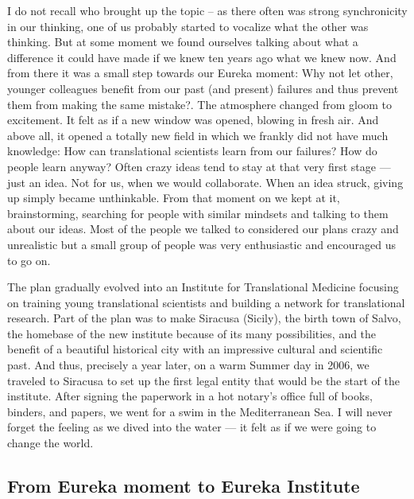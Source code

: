 \documentclass[authordate, editorial]{jote-new-article}
\begin{document}
	I do not recall who brought up the topic -- as there often was strong synchronicity in our thinking, one of us probably started to vocalize what the other was thinking. But at some moment we found ourselves talking about what a difference it could have made if we knew ten years ago what we knew now. And from there it was a small step towards our Eureka moment: Why not let other, younger colleagues benefit from our past (and present) failures and thus prevent them from making the same mistake?. The atmosphere changed from gloom to excitement. It felt as if a new window was opened, blowing in fresh air. And above all, it opened a totally new field in which we frankly did not have much knowledge: How can translational scientists learn from our failures? How do people learn anyway? Often crazy ideas tend to stay at that very first stage — just an idea. Not for us, when we would collaborate. When an idea struck, giving up simply became unthinkable. From that moment on we kept at it, brainstorming, searching for people with similar mindsets and talking to them about our ideas. Most of the people we talked to considered our plans crazy and unrealistic but a small group of people was very enthusiastic and encouraged us to go on.



	The plan gradually evolved into an Institute for Translational Medicine focusing on training young translational scientists and building a network for translational research. Part of the plan was to make Siracusa (Sicily), the birth town of Salvo, the homebase of the new institute because of its many possibilities, and the benefit of a beautiful historical city with an impressive cultural and scientific past. And thus, precisely a year later, on a warm Summer day in 2006, we traveled to Siracusa to set up the first legal entity that would be the start of the institute. After signing the paperwork in a hot notary's office full of books, binders, and papers, we went for a swim in the Mediterranean Sea. I will never forget the feeling as we dived into the water — it felt as if we were going to change the world.







	\subsection{From Eureka moment to Eureka Institute}
\end{document}
